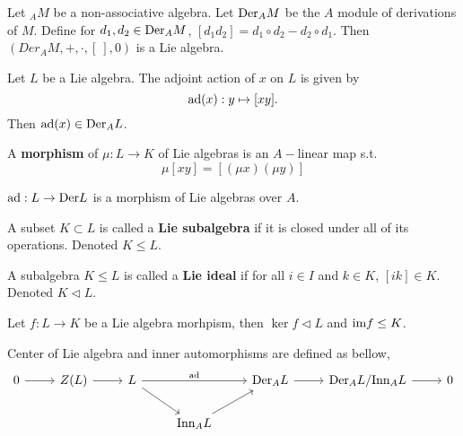 \begin{example}
    Let $_AM$ be a non-associative algebra. Let $\text{Der}_A M$ be the $A$ module of derivations of $M$. Define for  $d_1, d_2\in \text{Der}_A M$, $[d_1d_2]=d_1\circ d_2-d_2\circ d_1$. Then $(Der_AM, +, \cdot, [\ ], 0)$ is a Lie algebra.
\end{example}

\begin{example}
    Let $L$ be a Lie algebra. The adjoint action of $x$ on $L$ is given by 
    \[
        \text{ad}(x):y\mapsto [xy].
    \]
    Then $\text{ad}(x)\in \text{Der}_A L$.
\end{example}

\begin{definition}
    A \textbf{morphism} of $\mu: L\to K$ of Lie algebras is an $A-$linear map s.t.
    \[
        \mu[xy]=[(\mu x)(\mu y)]
    \]
\end{definition}

\begin{example}
    $\text{ad}:L\to \text{Der} L$ is a morphism of Lie algebras over $A$.
\end{example}

\begin{definition}
    A subset $K\subset L$ is called a \textbf{Lie subalgebra} if it is closed under all of its operations. Denoted $K\leq L$.
\end{definition}

\begin{definition}
    A subalgebra $K\leq L$ is called a \textbf{Lie ideal} if for all $i\in I$ and $k\in K$, $[ik]\in K$. Denoted $K\triangleleft L$.
\end{definition}

\begin{example}
    Let $f:L\to K$ be a Lie algebra morhpism, then $\ker f\triangleleft L$ and $\text{im} f\leq K$.
\end{example}

\begin{definition}
    Center of Lie algebra and inner automorphisms are defined as bellow,
    \[
        \begin{tikzcd}
            0\arrow[r] &Z(L)\arrow[r] &L\arrow[rr, "\ad"]\arrow[rd]&&\Der_AL\arrow[r]&\Der_AL/\Inn_A L\arrow[r]&0\\
            &&&\Inn_A L\arrow[ru]
        \end{tikzcd}
    \]
\end{definition}